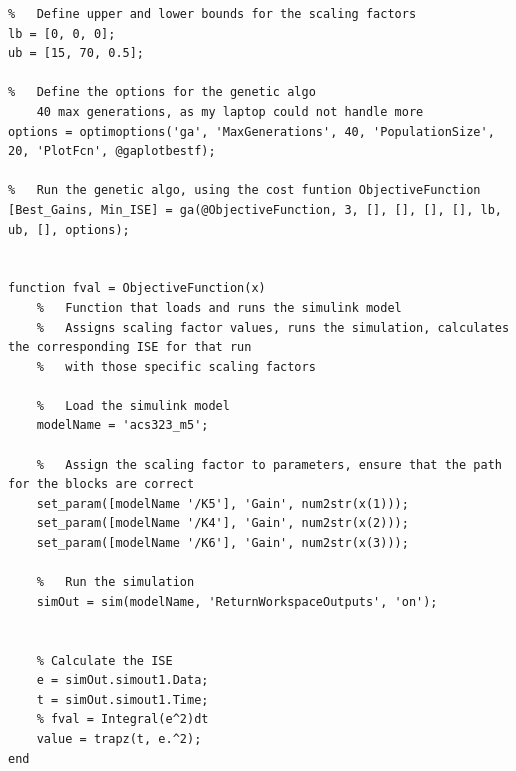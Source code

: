 \documentclass[12pt]{article}
\begin{document}
\begin{verbatim}
%   Define upper and lower bounds for the scaling factors
lb = [0, 0, 0]; 
ub = [15, 70, 0.5]; 

%   Define the options for the genetic algo
    40 max generations, as my laptop could not handle more
options = optimoptions('ga', 'MaxGenerations', 40, 'PopulationSize', 20, 'PlotFcn', @gaplotbestf);

%   Run the genetic algo, using the cost funtion ObjectiveFunction
[Best_Gains, Min_ISE] = ga(@ObjectiveFunction, 3, [], [], [], [], lb, ub, [], options);


function fval = ObjectiveFunction(x)
    %   Function that loads and runs the simulink model
    %   Assigns scaling factor values, runs the simulation, calculates the corresponding ISE for that run 
    %   with those specific scaling factors 

    %   Load the simulink model
    modelName = 'acs323_m5'; 
    
    %   Assign the scaling factor to parameters, ensure that the path for the blocks are correct
    set_param([modelName '/K5'], 'Gain', num2str(x(1)));
    set_param([modelName '/K4'], 'Gain', num2str(x(2)));
    set_param([modelName '/K6'], 'Gain', num2str(x(3)));
    
    %   Run the simulation
    simOut = sim(modelName, 'ReturnWorkspaceOutputs', 'on');
    
    
    % Calculate the ISE 
    e = simOut.simout1.Data;
    t = simOut.simout1.Time;
    % fval = Integral(e^2)dt
    value = trapz(t, e.^2); 
end
\end{verbatim}
\end{document}
